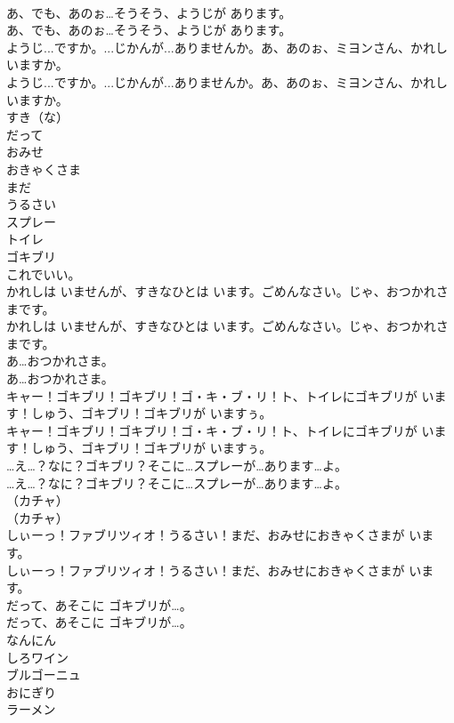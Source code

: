 \documentclass[8pt]{extreport}
\begin{document}
\begin{CJK}{UTF8}{min}
\\	あ、でも、あのぉ…そうそう、ようじが あります。	
\\	あ、でも、あのぉ…そうそう、ようじが あります。 
\\	ようじ...ですか。...じかんが...ありませんか。あ、あのぉ、ミヨンさん、かれし いますか。	
\\	ようじ...ですか。...じかんが...ありませんか。あ、あのぉ、ミヨンさん、かれし いますか。 
\\	すき（な）
\\	だって
\\	おみせ
\\	おきゃくさま
\\	まだ
\\	うるさい
\\	スプレー
\\	トイレ
\\	ゴキブリ
\\	これでいい。
\\	かれしは いませんが、すきなひとは います。ごめんなさい。じゃ、おつかれさまです。	
\\	かれしは いませんが、すきなひとは います。ごめんなさい。じゃ、おつかれさまです。 
\\	あ…おつかれさま。	
\\	あ…おつかれさま。 
\\	キャー！ゴキブリ！ゴキブリ！ゴ・キ・ブ・リ！ト、トイレにゴキブリが います！しゅう、ゴキブリ！ゴキブリが いますぅ。	
\\	キャー！ゴキブリ！ゴキブリ！ゴ・キ・ブ・リ！ト、トイレにゴキブリが います！しゅう、ゴキブリ！ゴキブリが いますぅ。 
\\	…え…？なに？ゴキブリ？そこに…スプレーが…あります…よ。	
\\	…え…？なに？ゴキブリ？そこに…スプレーが…あります…よ。 
\\	（カチャ）	
\\	（カチャ） 
\\	しぃーっ！ファブリツィオ！うるさい！まだ、おみせにおきゃくさまが います。	
\\	しぃーっ！ファブリツィオ！うるさい！まだ、おみせにおきゃくさまが います。 
\\	だって、あそこに ゴキブリが…。	
\\	だって、あそこに ゴキブリが…。 
\\	なんにん
\\	しろワイン
\\	ブルゴーニュ
\\	おにぎり
\\	ラーメン

\end{CJK}
\end{document}
